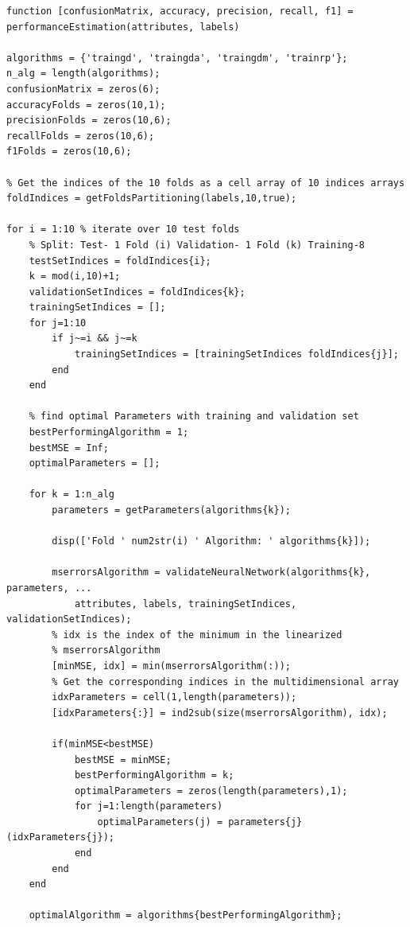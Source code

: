 \documentclass{article}
\begin{document}
\begin{lstlisting}[breaklines=true]
function [confusionMatrix, accuracy, precision, recall, f1] = performanceEstimation(attributes, labels)

algorithms = {'traingd', 'traingda', 'traingdm', 'trainrp'};
n_alg = length(algorithms);
confusionMatrix = zeros(6);
accuracyFolds = zeros(10,1);
precisionFolds = zeros(10,6);
recallFolds = zeros(10,6);
f1Folds = zeros(10,6);

% Get the indices of the 10 folds as a cell array of 10 indices arrays
foldIndices = getFoldsPartitioning(labels,10,true);

for i = 1:10 % iterate over 10 test folds
    % Split: Test- 1 Fold (i) Validation- 1 Fold (k) Training-8
    testSetIndices = foldIndices{i};
    k = mod(i,10)+1;
    validationSetIndices = foldIndices{k};
    trainingSetIndices = [];
    for j=1:10
        if j~=i && j~=k
            trainingSetIndices = [trainingSetIndices foldIndices{j}];
        end
    end
    
    % find optimal Parameters with training and validation set
    bestPerformingAlgorithm = 1;
    bestMSE = Inf;
    optimalParameters = [];
    
    for k = 1:n_alg
        parameters = getParameters(algorithms{k});
        
        disp(['Fold ' num2str(i) ' Algorithm: ' algorithms{k}]);
        
        mserrorsAlgorithm = validateNeuralNetwork(algorithms{k}, parameters, ...
            attributes, labels, trainingSetIndices, validationSetIndices);
        % idx is the index of the minimum in the linearized
        % mserrorsAlgorithm
        [minMSE, idx] = min(mserrorsAlgorithm(:));
        % Get the corresponding indices in the multidimensional array
        idxParameters = cell(1,length(parameters));
        [idxParameters{:}] = ind2sub(size(mserrorsAlgorithm), idx);
        
        if(minMSE<bestMSE)
            bestMSE = minMSE;
            bestPerformingAlgorithm = k;
            optimalParameters = zeros(length(parameters),1);
            for j=1:length(parameters)
                optimalParameters(j) = parameters{j}(idxParameters{j});
            end
        end
    end
    
    optimalAlgorithm = algorithms{bestPerformingAlgorithm};
\end{lstlisting}
\end{document}
